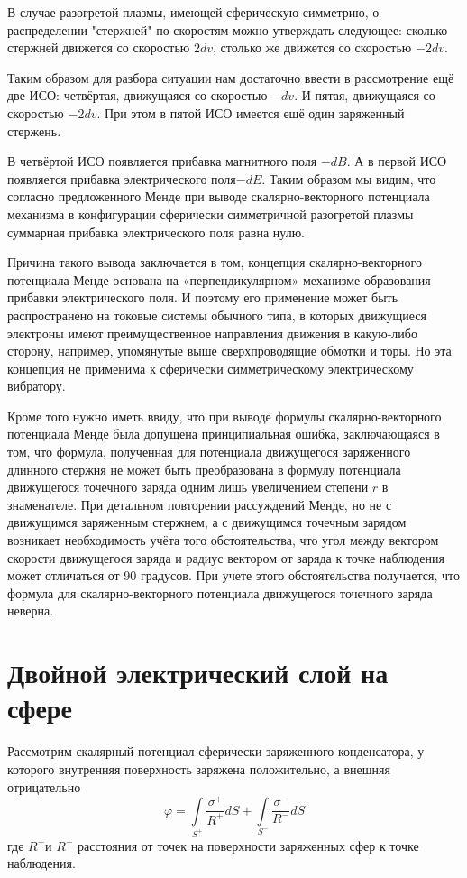 ﻿\documentclass[12pt, letterpaper]{article}
\begin{document}
В случае разогретой плазмы, имеющей сферическую симметрию, о распределении "стержней" по скоростям можно утверждать следующее: сколько стержней движется со скоростью $2dv$, столько же движется со скоростью $-2dv$.

Таким образом для разбора ситуации нам достаточно ввести в рассмотрение ещё две ИСО: четвёртая, движущаяся со скоростью $-dv$. И пятая, движущаяся со скоростью $-2dv$. При этом в пятой ИСО имеется ещё один заряженный стержень.

В четвёртой ИСО появляется прибавка магнитного поля $-dB$. А в первой ИСО появляется прибавка электрического поля$-dE$.
Таким образом мы видим, что согласно предложенного Менде при выводе скалярно-векторного потенциала механизма в конфигурации сферически симметричной разогретой плазмы суммарная прибавка электрического поля равна нулю.

Причина такого вывода заключается в том, концепция скалярно-векторного потенциала Менде основана на «перпендикулярном» механизме образования прибавки электрического поля. И поэтому его применение может быть распространено на токовые системы обычного типа, в которых движущиеся электроны имеют преимущественное направления движения в какую-либо сторону, например, упомянутые выше сверхпроводящие обмотки и торы. Но эта концепция не применима к сферически симметрическому электрическому вибратору.

Кроме того нужно иметь ввиду, что при выводе формулы скалярно-векторного потенциала Менде была допущена принципиальная ошибка, заключающаяся в том, что формула, полученная для потенциала движущегося заряженного длинного стержня не может быть преобразована в формулу потенциала движущегося точечного заряда одним лишь увеличением степени  $r$  в знаменателе. При детальном повторении рассуждений Менде, но не с движущимся заряженным стержнем, а с движущимся точечным зарядом возникает необходимость учёта того обстоятельства, что угол между вектором скорости движущегося заряда и радиус вектором от заряда к точке наблюдения может отличаться от 90 градусов. При учете этого обстоятельства получается, что формула для скалярно-векторного потенциала движущегося точечного заряда неверна.

\section{Двойной электрический слой на сфере}

Рассмотрим скалярный потенциал сферически заряженного конденсатора, у которого внутренняя поверхность заряжена положительно, а внешняя отрицательно
	\[\varphi =\int\limits_{{{S}^{+}}}{\frac{{{\sigma }^{+}}}{{{R}^{+}}}dS+}\int\limits_{{{S}^{-}}}{\frac{{{\sigma }^{-}}}{{{R}^{-}}}dS}\] 	
где ${{R}^{+}}$и ${{R}^{-}}$ расстояния от точек на поверхности заряженных сфер к точке наблюдения.
\end{document}
